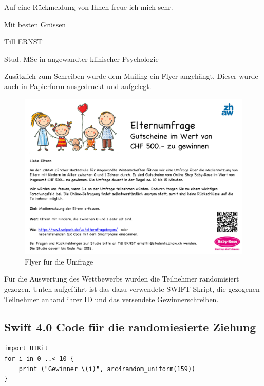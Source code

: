 \begin{flushleft}
\vspace{2mm}
Auf eine Rückmeldung von Ihnen freue ich mich sehr.

\vspace{2mm}
Mit besten Grüssen 

Till ERNST

Stud. MSc in angewandter klinischer Psychologie

\end{flushleft}

Zusätzlich zum Schreiben wurde dem Mailing ein Flyer angehängt. Dieser wurde auch in Papierform ausgedruckt und aufgelegt.


\begin{figure}[h]
  \centering
     \includegraphics[scale=0.9,angle=90]{content/Grafik/Flyer_Umfrage_v2.pdf}
  \captionsetup{margin=80pt}
  \caption{Flyer für die Umfrage}
  \label{fig:flyer}
\end{figure}

\newpage

Für die Auswertung des Wettbewerbs wurden die Teilnehmer randomisiert gezogen. Unten aufgeführt ist das dazu verwendete SWIFT-Skript, die gezogenen Teilnehmer anhand ihrer ID und das versendete Gewinnerschreiben.

\subsection*{Swift 4.0 Code für die randomiesierte Ziehung}

\begin{lstlisting}
import UIKit
for i in 0 ..< 10 {
    print ("Gewinner \(i)", arc4random_uniform(159))
}
\end{lstlisting}

